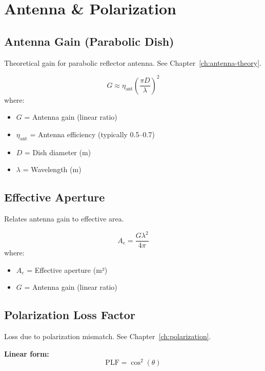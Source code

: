 \section{Antenna \& Polarization}
\label{sec:antenna-polarization}

\subsection{Antenna Gain (Parabolic Dish)}
\label{sec:antenna-gain}

Theoretical gain for parabolic reflector antenna. See Chapter~\ref{ch:antenna-theory}.

\begin{equation}
G \approx \eta_{\text{ant}} \left(\frac{\pi D}{\lambda}\right)^2
\label{eq:antenna-gain}
\end{equation}
where:
\begin{itemize}
\item $G$ = Antenna gain (linear ratio)
\item $\eta_{\text{ant}}$ = Antenna efficiency (typically 0.5--0.7)
\item $D$ = Dish diameter (m)
\item $\lambda$ = Wavelength (m)
\end{itemize}

\subsection{Effective Aperture}
\label{sec:effective-aperture}

Relates antenna gain to effective area.

\begin{equation}
A_e = \frac{G\lambda^2}{4\pi}
\label{eq:effective-aperture}
\end{equation}
where:
\begin{itemize}
\item $A_e$ = Effective aperture (m²)
\item $G$ = Antenna gain (linear ratio)
\end{itemize}

\subsection{Polarization Loss Factor}
\label{sec:polarization-loss}

Loss due to polarization mismatch. See Chapter~\ref{ch:polarization}.

\textbf{Linear form:}
\begin{equation}
\text{PLF} = \cos^2(\theta)
\label{eq:plf-linear}
\end{equation}

